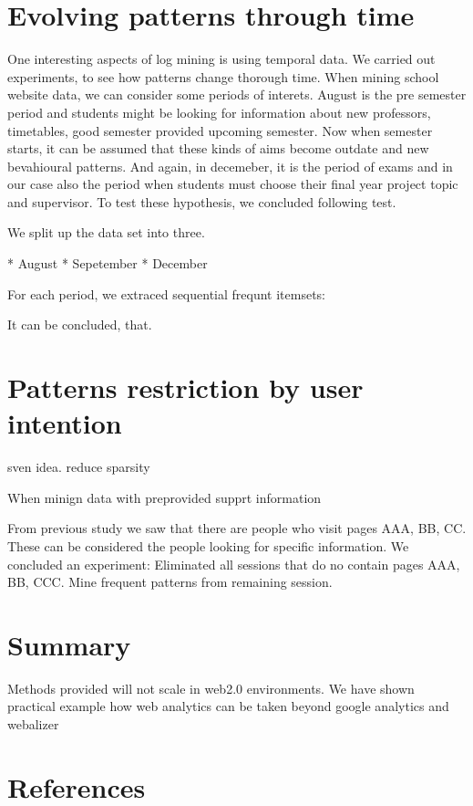 \documentclass[english,a4paper]{article}
\begin{document}
\section{Evolving patterns through time} 
One interesting aspects of log mining is using temporal data. We carried out experiments, to see how patterns change thorough time. When mining school website data, we can consider some periods of interets. August is the pre semester period and students might be looking for information about new professors, timetables, good semester provided upcoming semester. Now when semester starts, it can be assumed that these kinds of aims become outdate and new bevahioural patterns. And again, in decemeber, it is the period of exams and in our case also the period when students must choose their final year project topic and supervisor. To test these hypothesis, we concluded following test. 

We split up the data set into three.

* August
* Sepetember
* December

For each period, we extraced sequential frequnt itemsets:




It can be concluded, that.








\section{Patterns restriction by user intention}

sven idea. reduce sparsity 

When minign data with preprovided supprt information

From previous study we saw that there are people who visit pages AAA, BB, CC. These can be considered the people looking for specific information. We concluded an experiment:
Eliminated all sessions that do no contain pages AAA, BB, CCC.
Mine frequent patterns from remaining session.
















\section{Summary}
Methods provided will not scale in web2.0 environments.
We have shown practical example how web analytics can be taken beyond google analytics and webalizer










\section*{References}


\end{document}
